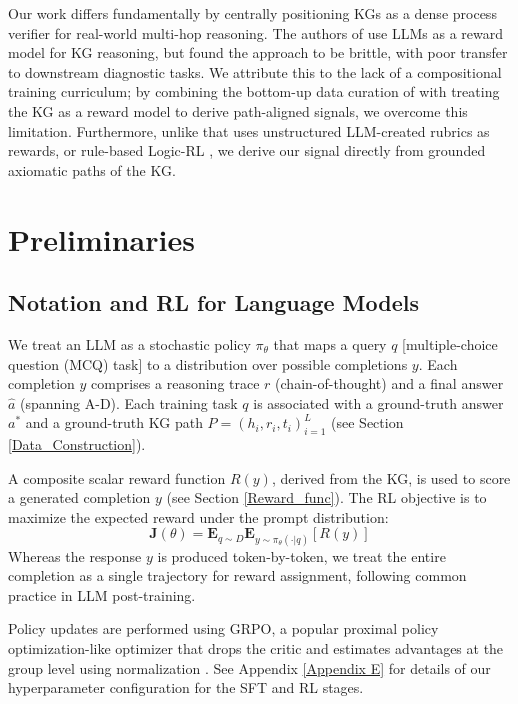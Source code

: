 \documentclass{article}
\theoremstyle{plain}
\theoremstyle{definition}
\theoremstyle{remark}
\begin{document}
Our work differs fundamentally by centrally positioning KGs as a dense process verifier for real-world multi-hop reasoning. The authors of \cite{khatwani2025brittleness} use LLMs as a reward model for KG reasoning, but found the approach to be brittle, with poor transfer to downstream diagnostic tasks. We attribute this to the lack of a compositional training curriculum; by combining the bottom-up data curation of \cite{Dedhia2025Bottom-upNeed} with treating the KG as a reward model to derive path-aligned signals, we overcome this limitation. Furthermore, unlike \cite{GunjalRubrics} that uses unstructured LLM-created rubrics as rewards, or rule-based Logic-RL \cite{XieLogicRL}, we derive our signal directly from grounded axiomatic paths of the KG. 

\section{Preliminaries}


\subsection{Notation and RL for Language Models}
We treat an LLM as a stochastic policy $\pi_\theta$ that maps a query $q$ [multiple-choice question (MCQ) task] to a distribution over possible completions $y$. Each completion $y$ comprises a reasoning trace $r$ (chain-of-thought) \cite{wei2022chain} and a final answer $\hat{a}$ (spanning A-D). Each training task $q$ is associated with a ground-truth answer $a^*$ and a ground-truth KG path $P={(h_i,r_i,t_i)}^L_{i=1}$ (see Section \ref{Data_Construction}). 

A composite scalar reward function $R(y)$, derived from the KG, is used to score a generated completion $y$ (see Section \ref{Reward_func}). The RL objective is to maximize the expected reward under the prompt distribution: 
\[
\mathbf{J}(\theta) = \mathbf{E}_{q\sim D}\mathbf{E}_{y\sim\pi_{\theta}(\cdot|q)}[R(y)]
\]
Whereas the response $y$ is produced token-by-token, we treat the entire completion as a single trajectory for reward assignment, following common practice in LLM post-training.

Policy updates are performed using GRPO, a popular proximal policy optimization-like optimizer \cite{schulman2017proximal} that drops the critic and estimates advantages at the group level using normalization \citep{guo2025deepseek}. See Appendix \ref{Appendix E} for details of our hyperparameter configuration for the SFT and RL stages.
\end{document}
